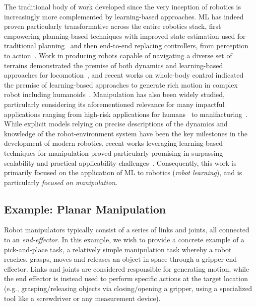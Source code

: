 The traditional body of work developed since the very inception of robotics is increasingly more complemented by learning-based approaches.
ML has indeed proven particularly transformative across the entire robotics stack, first empowering planning-based techniques with improved state estimation used for traditional planning~\citep{tangPerceptionNavigationAutonomous2023} and then end-to-end replacing controllers, from perception to action~\citep{koberReinforcementLearningRobotics}.
Work in producing robots capable of navigating a diverse set of terrains demonstrated the premise of both dynamics and learning-based approaches for locomotion~\citep{griffinWalkingStabilizationUsing2017,jiDribbleBotDynamicLegged2023,leeLearningQuadrupedalLocomotion2020,margolisRapidLocomotionReinforcement2022}, and recent works on whole-body control indicated the premise of learning-based approaches to generate rich motion in complex robot including humanoids~\citep{zhangWoCoCoLearningWholeBody2024,nvidiaGR00TN1Open2025}.
Manipulation has also been widely studied, particularly considering its aforementioned relevance for many impactful applications ranging from high-risk applications for humans~\citep{fujitaDevelopmentRobotsNuclear2020,alizadehComprehensiveSurveySpace2024,fujitaDevelopmentRobotsNuclear2020} to manifacturing~\citep{sannemanStateIndustrialRobotics2020}.
While explicit models relying on precise descriptions of the dynamics and knowledge of the robot-environment system have been the key milestones in the development of modern robotics, recent works leveraging learning-based techniques for manipulation proved particularly promising in surpassing scalability and practical applicability challenges~\citep{koberReinforcementLearningRobotics}.
Consequently, this work is primarily focused on the application of ML to robotics (\emph{robot learning}), and is particularly \emph{focused on manipulation}.

\subsection{Example: Planar Manipulation}

Robot manipulators typically consist of a series of links and joints, all connected to an \emph{end-effector}.
In this example, we wish to provide a concrete example of a pick-and-place task, a relatively simple manipulation task whereby a robot reaches, grasps, moves and releases an object in space through a gripper end-effector.
Links and joints are considered responsible for generating motion, while the end effector is instead used to perform specific actions at the target location (e.g., grasping/releasing objects via closing/opening a gripper, using a specialized tool like a screwdriver or any measurement device).

